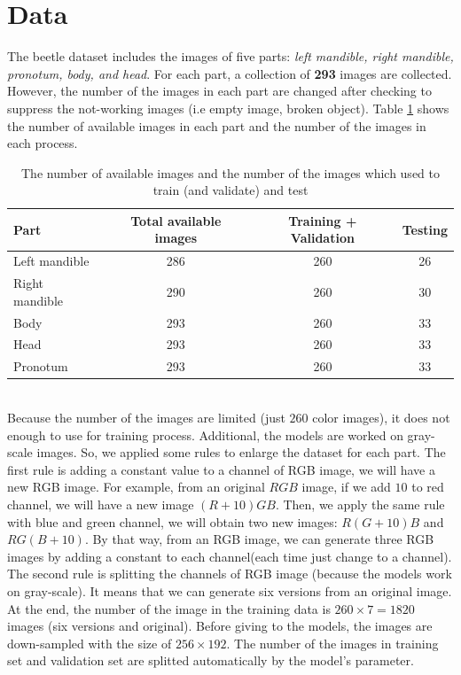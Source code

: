 \documentclass[12pt,a4paper]{article}
\begin{document}
\section{Data}
The beetle dataset includes the images of five parts: \textit{left mandible, right mandible, pronotum, body, and head}. For each part, a collection of \textbf{293} images are collected. However, the number of the images in each part are changed after checking to suppress the not-working images (i.e empty image, broken object). Table \ref{datatable} shows the number of available images in each part and the number of the images in each process.
\begin{table}[h!]
	\centering
	\begin{tabular}{l c c c}
	Part & Total available images & Training + Validation & Testing \\ \hline
	Left mandible & 286 & 260 & 26 \\ \hline
	Right mandible & 290 & 260 & 30 \\ \hline
	Body & 293 & 260 & 33 \\ \hline
	Head & 293 & 260 & 33 \\ \hline
	Pronotum & 293 & 260 & 33 \\ \hline
	\end{tabular}
	\caption{The number of available images and the number of the images which used to train (and validate) and test}
	\label{datatable}
\end{table}~\\
Because the number of the images are limited (just $260$ color images), it does not enough to use for training process. Additional, the models are worked on gray-scale images. So, we applied some rules to enlarge the dataset for each part. The first rule is adding a constant value to a channel of RGB image, we will have a new RGB image. For example, from an original $RGB$ image, if we add $10$ to red channel, we will have a new image $(R+10)GB$. Then, we apply the same rule with blue and green channel, we will obtain two new images: $R(G+10)B$ and $RG(B+10)$. By that way, from an RGB image, we can generate three RGB images by adding a constant to each channel(each time just change to a channel). The second rule is splitting the channels of RGB image (because the models work on gray-scale). It means that we can generate six versions from an original image. At the end, the number of the image in the training data is $ 260 \times 7 = 1820$ images (six versions and original). Before giving to the models, the images are down-sampled with the size of $256 \times 192$. The number of the images in training set and validation set are splitted automatically by the model's parameter.
\end{document}
